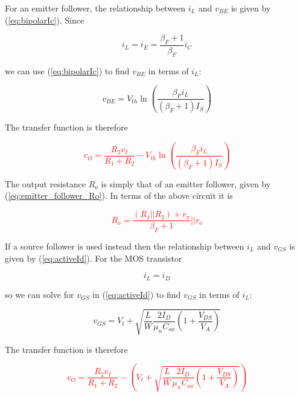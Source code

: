 For an emitter follower, the relationship between $i_{L}$ and $v_{BE}$ is given by (\ref{eq:bipolarIc}). Since

\begin{equation}
i_{L} = i_{E} = \frac{\beta_{F}+1}{\beta_{F}}i_{C}
\end{equation}

\noindent we can use (\ref{eq:bipolarIc}) to find $v_{BE}$ in terms of $i_{L}$:

\begin{equation}
v_{BE} = V_{th}\ln\left(\frac{\beta_{F}i_{L}}{(\beta_{F}+1)I_{S}}\right)
\end{equation}

\noindent The transfer function is therefore

\textcolor{red}{
\begin{equation}
v_{O} = \frac{R_{2}v_{I}}{R_{1}+R_{2}} - V_{th}\ln\left(\frac{\beta_{F}i_{L}}{(\beta_{F}+1)I_{S}}\right)
\end{equation}
}

The output resistance $R_{o}$ is simply that of an emitter follower, given by (\ref{eq:emitter_follower_Ro}). In terms of the above circuit it is

\textcolor{red}{
\begin{equation}
R_{o} = \frac{(R_{1}||R_{2})+r_{\pi}}{\beta_{F}+1}||r_{o}
\end{equation}
}

If a source follower is used instead then the relationship between $i_{L}$ and $v_{GS}$ is given by (\ref{eq:activeId}). For the MOS transistor

\begin{equation}
i_{L} = i_{D}
\end{equation}

\noindent so we can solve for $v_{GS}$ in (\ref{eq:activeId}) to find $v_{GS}$ in terms of $i_{L}$:

\begin{equation}
v_{GS} = V_{t} + \sqrt{\frac{L}{W}\frac{2I_{D}}{\mu_{n}C_{ox}}\left(1+\frac{V_{DS}}{V_{A}}\right)}
\end{equation}

\noindent The transfer function is therefore

\textcolor{red}{
\begin{equation}
v_{O} = \frac{R_{2}v_{I}}{R_{1}+R_{2}} - \left(V_{t} + \sqrt{\frac{L}{W}\frac{2I_{D}}{\mu_{n}C_{ox}}\left(1+\frac{V_{DS}}{V_{A}}\right)}\right)
\end{equation}
}

